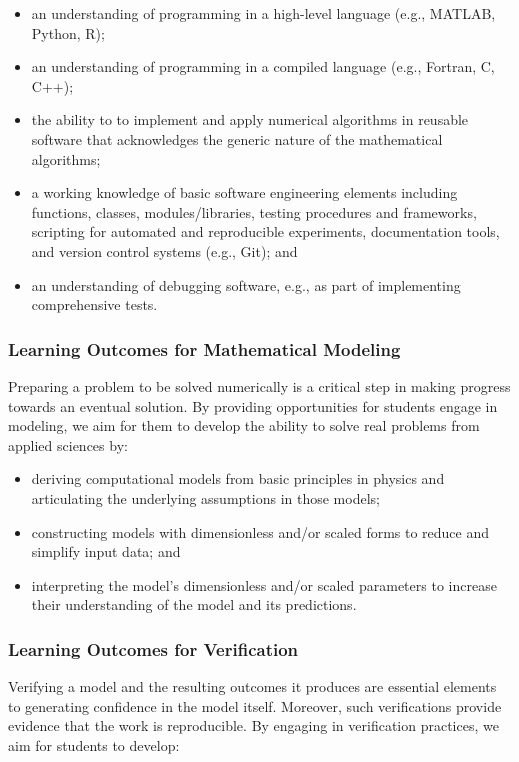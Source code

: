 \documentclass[graybox,envcountchap,sectrefs]{svmult}
\begin{document}
\begin{itemize}
\item an understanding of programming in a high-level language (e.g., MATLAB, Python, R);

\item an understanding of programming in a compiled language (e.g., Fortran, C, C++);

\item the ability to to implement and apply numerical algorithms in reusable software that acknowledges the generic nature of the mathematical algorithms;

\item a working knowledge of basic software engineering elements including functions, classes, modules/libraries, testing procedures and frameworks, scripting for automated and reproducible experiments, documentation tools, and version control systems (e.g., Git); and

\item an understanding of debugging software, e.g., as part of implementing comprehensive tests.
\end{itemize}


\subsubsection{Learning Outcomes for Mathematical Modeling}
Preparing a problem to be solved numerically is a critical step in making progress towards an eventual solution. By providing opportunities for students engage in modeling, we aim for them to develop the ability to solve real problems from applied sciences by:

\begin{itemize}
\item deriving computational models from basic principles in physics and articulating the underlying assumptions in those models;

\item constructing models with dimensionless and/or scaled forms to reduce and simplify input data; and

\item interpreting the model's dimensionless and/or scaled parameters to increase their understanding of the model and its predictions.
\end{itemize}


\subsubsection{Learning Outcomes for Verification}
Verifying a model and the resulting outcomes it produces are essential elements to generating confidence in the model itself. Moreover, such verifications provide evidence that the work is reproducible. By engaging in verification practices, we aim for students to develop:
\end{document}
